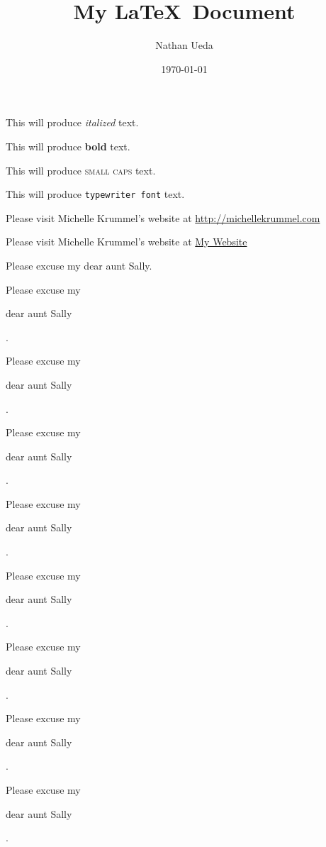 \documentclass[11pt]{article}
\title{My \LaTeX\ Document}
\author{Nathan Ueda}
\date{\today} %
\begin{document}
\tableofcontents %
\maketitle %
    This will produce \textit{italized} text.

    This will produce \textbf{bold} text.

    This will produce \textsc{small caps} text.

    This will produce \texttt{typewriter font} text.

    Please visit Michelle Krummel's website at \url{http://michellekrummel.com}

    Please visit Michelle Krummel's website at \href{http://michellekrummel.com}{My Website}
    
    \vspace{1cm}

    Please excuse my dear aunt Sally.

    Please excuse my \begin{large} dear aunt Sally \end{large}. %

    Please excuse my \begin{Large} dear aunt Sally \end{Large}. 

    Please excuse my \begin{huge} dear aunt Sally \end{huge}.

    Please excuse my \begin{Huge} dear aunt Sally \end{Huge}.

    Please excuse my \begin{normalsize} dear aunt Sally \end{normalsize}. %
    
    Please excuse my \begin{small} dear aunt Sally \end{small}. %

    Please excuse my \begin{scriptsize} dear aunt Sally \end{scriptsize}. 

    Please excuse my \begin{tiny} dear aunt Sally \end{tiny}. 
\end{document}
